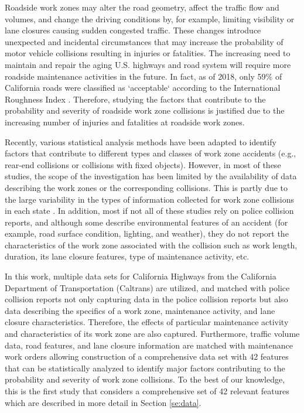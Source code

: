 \documentclass[10pt,a4paper]{article}
\begin{document}
Roadside work zones may alter the road geometry, affect the traffic flow and volumes, and change the driving conditions by, for example, limiting visibility or lane closures causing sudden congested traffic. These changes introduce unexpected and incidental circumstances that may increase the probability of motor vehicle collisions resulting in injuries or fatalities. The increasing need to maintain and repair the aging U.S.  highways and road system will require more roadside maintenance activities in the future. In fact, as of 2018, only 59\% of California roads were classified as `acceptable` according to the International Roughness Index \citep{roadcondition2018}. Therefore, studying the factors that contribute to the probability and severity of roadside work zone collisions is justified due to the increasing number of injuries and fatalities at roadside work zones.

Recently, various statistical analysis methods have been adapted to identify factors that contribute to different types and classes of work zone accidents (e.g., rear-end collisions or collisions with fixed objects). However, in most of these studies, the scope of the investigation has been limited by the availability of data describing the work zones or the corresponding collisions. This is partly due to the large variability in the types of information collected for work zone collisions in each state \citep{wzguidline2017}. In addition, most if not all of these studies rely on police collision reports, and although some describe environmental features of an accident (for example, road surface condition, lighting, and weather), they do not report the characteristics of the work zone associated with the collision such as work length, duration, its lane closure features, type of maintenance activity, etc.

In this work, multiple data sets for California Highways from the California Department of Transportation (Caltrans) are utilized, and matched with police collision reports not only capturing data in the police collision reports but also data describing the specifics of a work zone, maintenance activity, and lane closure characteristics. Therefore, the effects of particular maintenance activity and characteristics of its work zone are also captured. Furthermore, traffic volume data, road features, and lane closure information are matched with maintenance work orders allowing construction of a comprehensive data set with 42 features that can be statistically analyzed to identify major factors contributing to the probability and severity of work zone collisions. To the best of our knowledge, this is the first study that considers a comprehensive set of 42 relevant features which are described in more detail in Section \ref{se:data}.
\end{document}
